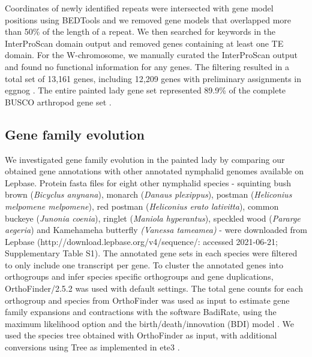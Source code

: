 \documentclass[twocolumn]{bmcart}%
\begin{document}
Coordinates of newly identified repeats were intersected with gene model positions using BEDTools \citep{quinlanBEDToolsFlexibleSuite2010} and we removed gene models that overlapped more than 50\% of the length of a repeat. We then searched for keywords in the InterProScan domain output and removed genes containing at least one TE domain. For the W-chromosome, we manually curated the InterProScan output and found no functional information for any genes. The filtering resulted in a total set of 13,161 genes, including 12,209 genes with preliminary assignments in eggnog \citep{huerta-cepasEggNOGHierarchicalFunctionally2019}. The entire painted lady gene set represented 89.9\% of the complete BUSCO arthropod gene set \citep{manniBUSCOUpdateNovel2021}.
\subsection*{Gene family evolution}
We investigated gene family evolution in the painted lady by comparing our obtained gene annotations with other annotated nymphalid genomes available on Lepbase. Protein fasta files for eight other nymphalid species - squinting bush brown (\textit{Bicyclus anynana}), monarch (\textit{Danaus plexippus}), postman (\textit{Heliconius melpomene melpomene}), red postman (\textit{Heliconius erato lativitta}), common buckeye (\textit{Junonia coenia}), ringlet (\textit{Maniola hyperantus}), speckled wood (\textit{Pararge aegeria}) and Kamehameha butterfly \textit{(Vanessa tamea\-mea)} - were downloaded from Lepbase (http://down\-load.\-lep\-base.org/v4/sequence/: accessed 2021-06-21; Supplementary Table S1). The annotated gene sets in each species were filtered to only include one transcript per gene. To cluster the annotated genes into orthogroups and infer species specific orthogroups and gene duplications, OrthoFinder/2.5.2 \citep{emmsOrthoFinderPhylogeneticOrthology2019} was used with default settings. The total gene counts for each orthogroup and species from OrthoFinder was used as input to estimate gene family expansions and contractions with the software BadiRate, using the maximum likelihood option and the birth/death/innovation (BDI) model \citep{libradoBadiRateEstimatingFamily2012}. We used the species tree obtained with OrthoFinder as input, with additional conversions using Tree as implemented in ete3 \citep{huerta-cepasETEReconstructionAnalysis2016}. 
\end{document}

